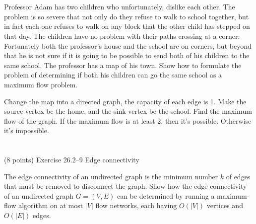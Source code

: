 \documentclass[paper=a4, fontsize=11pt]{scrartcl} %
\begin{document}
\maketitle %

\section{}

\begin{fancyquotes}
  Professor Adam has two children who unfortunately, dislike each
  other. The problem is so severe that not only do they refuse to walk
  to school together, but in fact each one refuses to walk on any
  block that the other child has stepped on that day. The children
  have no problem with their paths crossing at a corner. Fortunately
  both the professor's house and the school are on corners, but beyond
  that he is not sure if it is going to be possible to send both of
  his children to the same school. The professor has a map of his
  town. Show how to formulate the problem of determining if both his
  children can go the same school as a maximum flow problem.
\end{fancyquotes}

Change the map into a directed graph, the capacity of each edge is 1.
Make the source vertex be the home, and the sink vertex be the school.
Find the maximum flow of the graph.
If the maximum flow is at least 2, then it's possible. Otherwise it's
impossible.

\pagebreak

\section{}

\begin{fancyquotes}
   (8 points) Exercise 26.2--9 Edge connectivity

   The edge connectivity of an undirected graph is the minimum number
   $k$ of edges that must be removed to disconnect the graph. Show how
   the edge connectivity of an undirected graph $G = (V, E)$ can be
   determined by running a maximum-flow algorithm on at most $|V|$
   flow networks, each having $O(|V|)$ vertices and $O(|E|)$ edges.
\end{fancyquotes}
\end{document}
